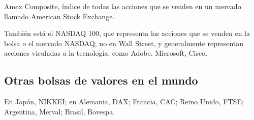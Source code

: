 Amex Composite, índice de todas las acciones que se venden en un mercado
llamado American Stock Exchange.

También está el NASDAQ 100, que representa las acciones que se venden en la
bolsa o el mercado NASDAQ, no en Wall Street, y generalmente representan
acciones viculadas a la tecnología, como Adobe, Microsoft, Cisco.

\subsection{Otras bolsas de valores en el mundo}

En Japón, NIKKEI; en Alemania, DAX; Francia, CAC; Reino Unido, FTSE; Argentina,
Merval; Brasil, Bovespa.
